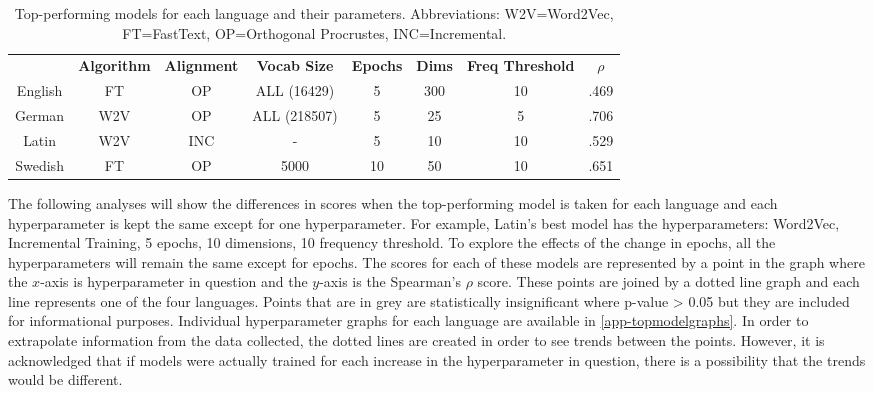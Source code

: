 \begin{table}[h]
\centering
\begin{tabular}{cccccccc} 
\toprule
\textbf{ } & \textbf{ Algorithm } & \textbf{ Alignment } & \textbf{ Vocab Size } & \textbf{ Epochs } & \textbf{ Dims } & \textbf{ Freq Threshold } & \textbf{ $\rho$ }  \\
English    & FT              & OP               & ALL (16429)      & 5                 & 300             & 10               & .469            \\
German     & W2V             & OP               & ALL (218507)     & 5                 & 25              & 5                & .706            \\
Latin      & W2V             & INC              & -                & 5                 & 10              & 10               & .529            \\
Swedish    & FT              & OP               & 5000             & 10                & 50              & 10               & .651            \\
\bottomrule
\end{tabular}
\caption{Top-performing models for each language and their parameters. Abbreviations: W2V=Word2Vec, FT=FastText, OP=Orthogonal Procrustes, INC=Incremental.}
\label{tab:top-models}
\end{table}

The following analyses will show the differences in scores when the top-performing model is taken for each language and each hyperparameter is kept the same except for one hyperparameter. For example, Latin’s best model has the hyperparameters: Word2Vec, Incremental Training, 5 epochs, 10 dimensions, 10 frequency threshold. To explore the effects of the change in epochs, all the hyperparameters will remain the same except for epochs. The scores for each of these models are represented by a point in the graph where the $x$-axis is hyperparameter in question and the $y$-axis is  the Spearman's $\rho$ score. These points are joined by a dotted line graph and each line represents one of the four languages. Points that are in grey are statistically insignificant where p-value > 0.05 but they are included for informational purposes. Individual hyperparameter graphs for each language are available in \autoref{app-topmodelgraphs}. In order to extrapolate information from the data collected, the dotted lines are created in order to see trends between the points. However, it is acknowledged that if models were actually trained for each increase in the hyperparameter in question, there is a possibility that the trends would be different. 

